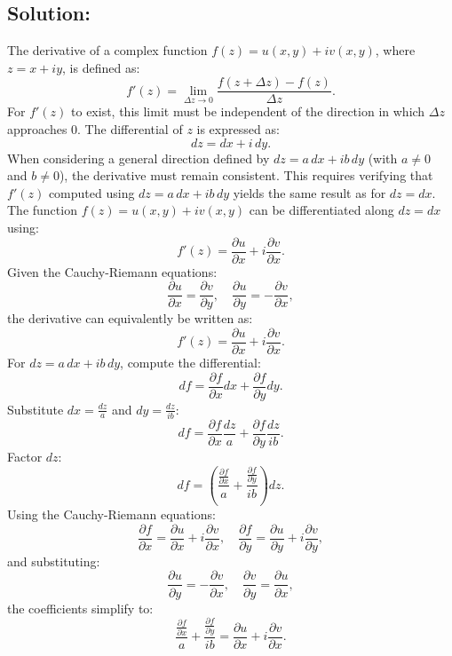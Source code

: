\documentclass[12pt]{article}
\begin{document}
    \subsection*{Solution:} 
        The derivative of a complex function \(f(z) = u(x, y) + i v(x, y)\), where \(z = x + i y\), is defined as:
        \[
        f'(z) = \lim_{\Delta z \to 0} \frac{f(z + \Delta z) - f(z)}{\Delta z}.
        \]
        For \(f'(z)\) to exist, this limit must be independent of the direction in which \(\Delta z\) approaches \(0\).
        The differential of \(z\) is expressed as:
        \[
        dz = dx + i \, dy.
        \]
        When considering a general direction defined by \(dz = a \, dx + i b \, dy\) (with \(a \neq 0\) and \(b \neq 0\)), the derivative must remain consistent. This requires verifying that \(f'(z)\) computed using \(dz = a \, dx + i b \, dy\) yields the same result as for \(dz = dx\).
        The function \(f(z) = u(x, y) + i v(x, y)\) can be differentiated along \(dz = dx\) using:
        \[
        f'(z) = \frac{\partial u}{\partial x} + i \frac{\partial v}{\partial x}.
        \]
        Given the Cauchy-Riemann equations:
        \[
        \frac{\partial u}{\partial x} = \frac{\partial v}{\partial y}, \quad \frac{\partial u}{\partial y} = -\frac{\partial v}{\partial x},
        \]
        the derivative can equivalently be written as:
        \[
        f'(z) = \frac{\partial u}{\partial x} + i \frac{\partial v}{\partial x}.
        \]
        For \(dz = a \, dx + i b \, dy\), compute the differential:
        \[
        df = \frac{\partial f}{\partial x} dx + \frac{\partial f}{\partial y} dy.
        \]
        Substitute \(dx = \frac{dz}{a}\) and \(dy = \frac{dz}{i b}\):
        \[
        df = \frac{\partial f}{\partial x} \frac{dz}{a} + \frac{\partial f}{\partial y} \frac{dz}{ib}.
        \]
        Factor \(dz\):
        \[
        df = \left( \frac{\frac{\partial f}{\partial x}}{a} + \frac{\frac{\partial f}{\partial y}}{ib} \right) dz.
        \]
        Using the Cauchy-Riemann equations:
        \[
        \frac{\partial f}{\partial x} = \frac{\partial u}{\partial x} + i \frac{\partial v}{\partial x}, \quad \frac{\partial f}{\partial y} = \frac{\partial u}{\partial y} + i \frac{\partial v}{\partial y},
        \]
        and substituting:
        \[
        \frac{\partial u}{\partial y} = -\frac{\partial v}{\partial x}, \quad \frac{\partial v}{\partial y} = \frac{\partial u}{\partial x},
        \]
        the coefficients simplify to:
        \[
        \frac{\frac{\partial f}{\partial x}}{a} + \frac{\frac{\partial f}{\partial y}}{ib} = \frac{\partial u}{\partial x} + i \frac{\partial v}{\partial x}.
        \]
\end{document}

